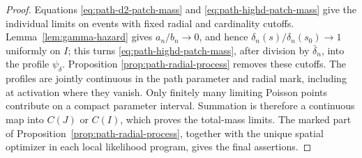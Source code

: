 \begin{proof}
Equations \eqref{eq:path-d2-patch-mass} and
\eqref{eq:path-highd-patch-mass} give the individual limits on events with
fixed radial and cardinality cutoffs. Lemma~\ref{lem:gamma-hazard} gives
\(a_n/b_n\to0\), and hence
\(\delta_n(s)/\delta_n(s_0)\to1\) uniformly on \(I\); this turns
\eqref{eq:path-highd-patch-mass}, after division by \(\bar\delta_n\), into the
profile \(\psi_\delta\). Proposition
\ref{prop:path-radial-process} removes these cutoffs. The profiles are jointly
continuous in the path parameter and radial mark, including at activation
where they vanish. Only finitely many limiting Poisson points contribute on a
compact parameter interval. Summation is therefore a continuous map into
\(C(J)\) or \(C(I)\), which proves the total-mass limits. The marked part of
Proposition~\ref{prop:path-radial-process}, together with the unique spatial
optimizer in each local likelihood program, gives the final assertions.
\end{proof}
